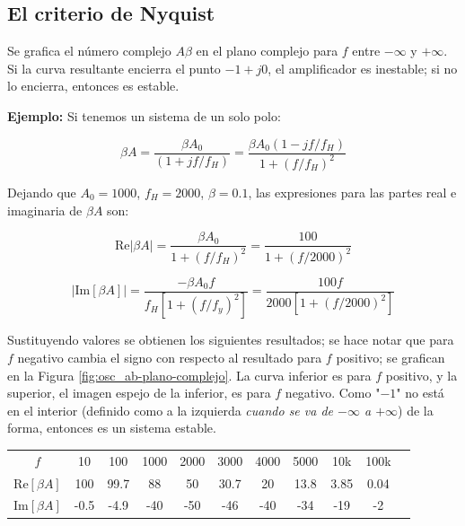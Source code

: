 \subsection{El criterio de Nyquist} %

Se grafica el número complejo \( A\beta \) en el plano complejo para \( f \) entre \( -\infty \) y \( +\infty \). Si la curva resultante encierra el punto \( -1+j0 \), el amplificador es inestable; si no lo encierra, entonces es estable.

\textbf{Ejemplo:} Si tenemos un sistema de un solo polo:

\[
\beta A = \frac{\beta A_0}{(1+jf/f_H)} = \frac{\beta A_0 (1 - jf/f_H)}{1+(f/f_H)^2}
\]

Dejando que \( A_0 = 1000 \), \( f_H = 2000 \), \( \beta = 0.1 \), las expresiones para las partes real e imaginaria de \( \beta A \) son:

\[
\text{Re}|\beta A| = \frac{\beta A_0}{1 + (f/f_H)^2} = \frac{100}{1 + (f/2000)^2}
\]

\[
|\text{Im}[\beta A]| = \frac{-\beta A_0 f}{f_H [1+(f/f_y)^2]} = \frac{100f}{2000[1+(f/2000)^2]}
\]

Sustituyendo valores se obtienen los siguientes resultados; se hace notar que para $f$ negativo cambia el signo con respecto al resultado para $f$ positivo; se grafican en la Figura \ref{fig:osc_ab-plano-complejo}. La curva inferior es para $f$ positivo, y la superior, el imagen espejo de la inferior, es para $f$ negativo. Como "$-1$" no está en el interior (definido como a la izquierda \textit{cuando se va de $-\infty$ a $+\infty$}) de la forma, entonces es un sistema estable.

\begin{tabular}{c|cccccccccc}
	$f$     & 10  & 100 & 1000 & 2000 & 3000 & 4000 & 5000 & 10k  & 100k \\
	Re$[\beta A]$ & 100 & 99.7 & 88   & 50   & 30.7 & 20   & 13.8 & 3.85 & 0.04 \\
	Im$[\beta A]$ & -0.5& -4.9 & -40  & -50  & -46  & -40  & -34  & -19  & -2 \\
\end{tabular}

